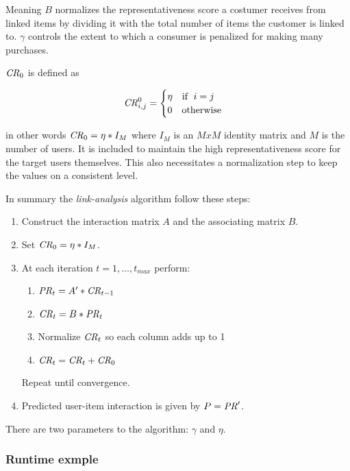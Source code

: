 Meaning $B$ normalizes the representativeness score a costumer receives from linked items by dividing it with the total number of items the customer is linked to.  $\gamma$ controls the extent to which a consumer is penalized for making many purchases.

$\mathit{CR}_0$ is defined as

\begin{equation}
    \mathit{CR}_{i, j}^0 = \begin{cases}
        \eta \quad \text{if } \; i = j \\
        0    \quad \text{otherwise}
    \end{cases}
\end{equation}

in other words $\mathit{CR}_0 = \eta * I_M$ where $I_M$ is an $M x M$ identity matrix and $M$ is the number of users.  It is included to maintain the high representativeness score for the target users themselves. This also necessitates a normalization step to keep the values on a consistent level.

In summary the \textit{link-analysis} algorithm follow these steps:

\begin{enumerate}
    \item Construct the interaction matrix $A$ and the associating matrix $B$.

    \item Set $\mathit{CR}_0 = \eta * I_M$.
    \item At each iteration $t = 1, \ldots, t_{max}$ perform:

        \begin{enumerate}
            \item $\mathit{PR}_t = A' * \mathit{CR}_{t- 1}$
            \item $\mathit{CR}_t = B * \mathit{PR}_t$
            \item Normalize $\mathit{CR}_t$ so each column adds up to 1
            \item $\mathit{CR}_t = \mathit{CR}_t + \mathit{CR}_0$
        \end{enumerate}

        Repeat until convergence.

    \item Predicted user-item interaction is given by $P = \mathit{PR}'$.

\end{enumerate}

There are two parameters to the algorithm: $\gamma$ and $\eta$.


\subsubsection{Runtime exmple}

